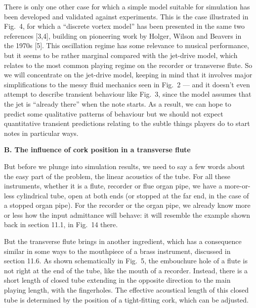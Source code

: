   There is only one other case for which a simple model suitable for simulation 
  has been developed and validated against experiments. This is the case 
  illustrated in Fig.\ 4, for which a “discrete vortex model” has been 
  presented in the same two references [3,4], building on pioneering work by 
  Holger, Wilson and Beavers in the 1970s [5]. This oscillation regime has some 
  relevance to musical performance, but it seems to be rather marginal compared 
  with the jet-drive model, which relates to the most common playing regime on 
  the recorder or transverse flute. So we will concentrate on the jet-drive 
  model, keeping in mind that it involves major simplifications to the messy 
  fluid mechanics seen in Fig.\ 2 — and it doesn’t even attempt to describe 
  transient behaviour like Fig.\ 3, since the model assumes that the jet is 
  ``already there'' when the note starts. As a result, we can hope to predict 
  some qualitative patterns of behaviour but we should not expect quantitative 
  transient predictions relating to the subtle things players do to start notes 
  in particular ways. 

  \textbf{B. The influence of cork position in a transverse flute} 

  But before we plunge into simulation results, we need to say a few words 
  about the easy part of the problem, the linear acoustics of the tube. For all 
  these instruments, whether it is a flute, recorder or flue organ pipe, we 
  have a more-or-less cylindrical tube, open at both ends (or stopped at the 
  far end, in the case of a stopped organ pipe). For the recorder or the organ 
  pipe, we already know more or less how the input admittance will behave: it 
  will resemble the example shown back in section 11.1, in Fig.\ 14 there. 

  But the transverse flute brings in another ingredient, which has a 
  consequence similar in some ways to the mouthpiece of a brass instrument, 
  discussed in section 11.6. As shown schematically in Fig.\ 5, the embouchure 
  hole of a flute is not right at the end of the tube, like the mouth of a 
  recorder. Instead, there is a short length of closed tube extending in the 
  opposite direction to the main playing length, with the fingerholes. The 
  effective acoustical length of this closed tube is determined by the position 
  of a tight-fitting cork, which can be adjusted. 


